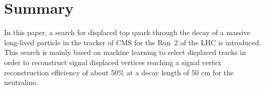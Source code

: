 \documentclass{cernatlasnote}
\begin{document}
\newpage
\section{Summary}

In this paper, a search for displaced top quark through the decay of a massive long-lived particle in the tracker of CMS for the Run~2 of the LHC is introduced. This search is mainly based on machine learning to select displaced tracks in order to reconstruct signal displaced vertices reaching a signal vertex reconstruction efficiency of about 50\% at a decay length of 50 cm for the neutralino.

\label{SEC: SUM}
\end{document}
